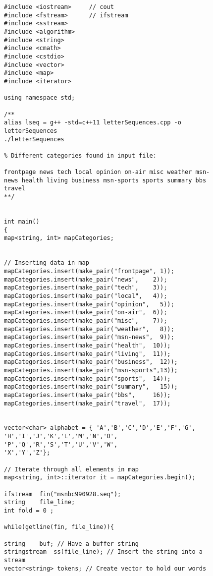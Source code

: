 \begin{figure}[tb]%
	\centering
	
	

\begin{lstlisting}[frame=single,basicstyle=\ttfamily\tiny,]
#include <iostream>     // cout
#include <fstream>      // ifstream
#include <sstream>
#include <algorithm>
#include <string>
#include <cmath>
#include <cstdio>
#include <vector>
#include <map>
#include <iterator>

using namespace std;

/** 
alias lseq = g++ -std=c++11 letterSequences.cpp -o letterSequences 
./letterSequences

% Different categories found in input file:

frontpage news tech local opinion on-air misc weather msn-news health living business msn-sports sports summary bbs travel
**/


int main()
{
map<string, int> mapCategories;


// Inserting data in map
mapCategories.insert(make_pair("frontpage", 1));
mapCategories.insert(make_pair("news",    2));
mapCategories.insert(make_pair("tech",    3));
mapCategories.insert(make_pair("local",   4));
mapCategories.insert(make_pair("opinion",   5));
mapCategories.insert(make_pair("on-air",  6));
mapCategories.insert(make_pair("misc",    7));
mapCategories.insert(make_pair("weather",   8));
mapCategories.insert(make_pair("msn-news",  9));
mapCategories.insert(make_pair("health",  10));
mapCategories.insert(make_pair("living",  11));
mapCategories.insert(make_pair("business",  12));
mapCategories.insert(make_pair("msn-sports",13));
mapCategories.insert(make_pair("sports",  14));
mapCategories.insert(make_pair("summary",   15));
mapCategories.insert(make_pair("bbs",     16));
mapCategories.insert(make_pair("travel",  17));


vector<char> alphabet = { 'A','B','C','D','E','F','G',
'H','I','J','K','L','M','N','O',
'P','Q','R','S','T','U','V','W',
'X','Y','Z'};

// Iterate through all elements in map
map<string, int>::iterator it = mapCategories.begin();

ifstream  fin("msnbc990928.seq");
string    file_line;
int fold = 0 ;

while(getline(fin, file_line)){

string    buf; // Have a buffer string
stringstream  ss(file_line); // Insert the string into a stream
vector<string> tokens; // Create vector to hold our words


\end{lstlisting}
\end{figure}
